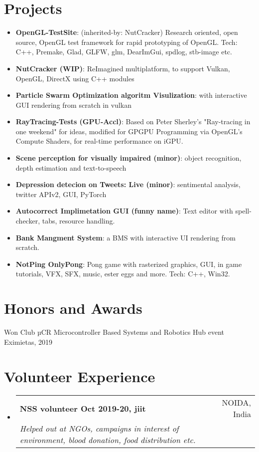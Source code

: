 \documentclass[a4paper,10pt]{article}
\makeatletter
\newcommand{\resumeItem}[2]{
  \item\small{
    \textbf{#1}{: #2 \vspace{-2pt}}
  }
}
\newcommand{\resumeSubheading}[4]{
  \vspace{-1pt}\item
    \begin{tabular*}{0.97\textwidth}{l@{\extracolsep{\fill}}r}
      \textbf{#1} & #2 \\
      \textit{#3} & \textit{#4} \\
    \end{tabular*}\vspace{-5pt}
}
\newcommand{\resumeSubItem}[2]{\resumeItem{#1}{#2}\vspace{-3pt}}
\newcommand{\resumeSubHeadingListStart}{\begin{itemize}[leftmargin=*]}
\newcommand{\resumeSubHeadingListEnd}{\end{itemize}}
\makeatother
\begin{document}
\section{Projects}
  \resumeSubHeadingListStart
  \resumeSubItem{OpenGL-TestSite}{(inherited-by: NutCracker) Research oriented, open source, OpenGL test framework for rapid prototyping of OpenGL. Tech: C++, Premake, Glad, GLFW, glm, DearImGui, spdlog, stb-image etc. }\hspace{25pt}{(May-Oct '21)}
    \resumeSubItem{NutCracker (WIP)}{ReImagined multiplatform, to support Vulkan, OpenGL, DirectX using C++ modules}{(May-`Till '22)}
    \resumeSubItem{Particle Swarm Optimization algoritm Visulization}{with interactive GUI rendering from scratch in vulkan}{(May '22)}
    \resumeSubItem{RayTracing-Tests (GPU-Accl)}{Based on Peter Sherley’s "Ray-tracing in one weekend" for ideas, modified for GPGPU Programming via OpenGL's Compute Shaders, for real-time performance on iGPU.}\hspace{107pt}{(Jun-Aug '21)}
    \resumeSubItem{Scene perception for visually impaired (minor)}{object recognition, depth estimation and text-to-speech}\hspace{16pt}{(Apr '22)}
    \resumeSubItem{Depression detecion on Tweets: Live (minor)}{sentimental analysis, twitter APIv2, GUI, PyTorch}\hspace{42pt}{(Nov '21)}
    \resumeSubItem{Autocorrect Implimetation GUI (funny name)}{Text editor with spell-checker, tabs, resource handling.}\hspace{-3pt}{(May-Aug '21)}
    \resumeSubItem{Bank Mangment System}{a BMS with interactive UI rendering from scratch.}\hspace{135pt}{(May '20)}
    \resumeSubItem{NotPing OnlyPong}{Pong game with rasterized graphics, GUI, in game tutorials, VFX, SFX, music, ester eggs and more. Tech: C++, Win32.}{(Nov '20)}
  \resumeSubHeadingListEnd
\vspace{-5pt}
\section{Honors and Awards}
\begin{description}[font=$\bullet$]
\item {Won Club µCR Microcontroller Based Systems and Robotics Hub event Eximietas, 2019 }
\end{description}
\vspace{-6pt}
\section{Volunteer Experience}
  \resumeSubHeadingListStart
    \resumeSubheading
        {NSS volunteer Oct 2019-20, jiit}{NOIDA, India}
        {Helped out at NGOs, campaigns in interest of environment, blood donation, food distribution etc. }{} \\
  \resumeSubHeadingListEnd
\vspace{-6pt}
\end{document}

